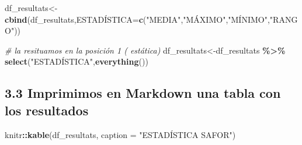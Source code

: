\documentclass[
]{article}
\newenvironment{Shaded}{\begin{snugshade}}{\end{snugshade}}
\newcommand{\AttributeTok}[1]{\textcolor[rgb]{0.13,0.29,0.53}{#1}}
\newcommand{\CommentTok}[1]{\textcolor[rgb]{0.56,0.35,0.01}{\textit{#1}}}
\newcommand{\FunctionTok}[1]{\textcolor[rgb]{0.13,0.29,0.53}{\textbf{#1}}}
\newcommand{\NormalTok}[1]{#1}
\newcommand{\OtherTok}[1]{\textcolor[rgb]{0.56,0.35,0.01}{#1}}
\newcommand{\SpecialCharTok}[1]{\textcolor[rgb]{0.81,0.36,0.00}{\textbf{#1}}}
\newcommand{\StringTok}[1]{\textcolor[rgb]{0.31,0.60,0.02}{#1}}
\begin{document}
\begin{Shaded}
\begin{Highlighting}[]
\NormalTok{df\_resultats}\OtherTok{\textless{}{-}}\FunctionTok{cbind}\NormalTok{(df\_resultats,ESTADÍSTICA}\OtherTok{=}\FunctionTok{c}\NormalTok{(}\StringTok{"MEDIA"}\NormalTok{,}\StringTok{"MÁXIMO"}\NormalTok{,}\StringTok{"MÍNIMO"}\NormalTok{,}\StringTok{"RANGO"}\NormalTok{))}
\end{Highlighting}
\end{Shaded}

\begin{Shaded}
\begin{Highlighting}[]
\CommentTok{\# la resituamos en la posición 1 ( estática)}
\NormalTok{df\_resultats}\OtherTok{\textless{}{-}}\NormalTok{df\_resultats }\SpecialCharTok{\%\textgreater{}\%} \FunctionTok{select}\NormalTok{(}\StringTok{"ESTADÍSTICA"}\NormalTok{,}\FunctionTok{everything}\NormalTok{())}
\end{Highlighting}
\end{Shaded}

\hypertarget{imprimimos-en-markdown-una-tabla-con-los-resultados}{%
\subsection{3.3 Imprimimos en Markdown una tabla con los
resultados}\label{imprimimos-en-markdown-una-tabla-con-los-resultados}}

\begin{Shaded}
\begin{Highlighting}[]
\NormalTok{knitr}\SpecialCharTok{::}\FunctionTok{kable}\NormalTok{(df\_resultats, }\AttributeTok{caption =} \StringTok{"ESTADÍSTICA SAFOR"}\NormalTok{)}
\end{Highlighting}
\end{Shaded}
\end{document}
